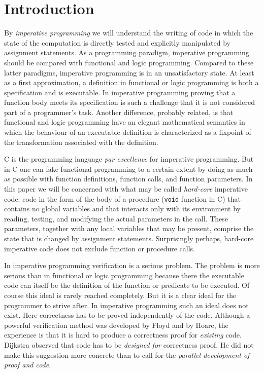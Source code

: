 \documentclass[preprint,11pt]{elsarticle}
\begin{document}
\section{Introduction}
By \emph{imperative programming} we will understand
the writing of code in which the state of the computation
is directly tested
and explicitly manipulated by assignment statements.
As a programming paradigm, imperative programming should be
compared with functional and logic programming.
Compared to these latter paradigms,
imperative programming is in an unsatisfactory state.
At least as a first approximation,
a definition in functional or logic programming
is both a specification and is executable.
In imperative programming proving that a function body
meets its specification is such a challenge
that it is not considered part of a programmer's task.
Another difference, probably related,
is that functional and logic programming
have an elegant mathematical semantics
in which the behaviour of an executable definition
is characterized as a fixpoint of the transformation
associated with the definition.

C is the programming language \emph{par excellence}
for imperative programming.
But in C one can fake functional programming to a certain extent
by doing as much as possible with function definitions,
function calls, and function parameters.
In this paper we will be concerned with what may be called
\emph{hard-core} imperative code:
code in the form of the body of a procedure
({\tt void} function in C) that contains no global variables
and that interacts only with its environment
by reading, testing, and modifying the actual parameters in the call.
These parameters,
together with any local variables that may be present,
comprise the state that is changed by assignment statements.
Surprisingly perhaps, hard-core imperative code does not
exclude function or procedure calls.

In imperative programming verification is a serious problem.
The problem is more serious than in functional or logic
programming because there the executable code can itself be 
the definition of the function or predicate to be executed.
Of course this ideal is rarely reached completely.
But it is a clear ideal for the programmer to strive after.
In imperative programming such an ideal does not exist.
Here correctness has to be proved independently of the code.
Although a powerful verification method was developed
by Floyd and by Hoare,
the experience is that it is hard to produce
a correctness proof for \emph{existing} code.
Dijkstra observed \cite{djk68a,djkInfotech71}
that code has to be \emph{designed
for} correctness proof.
He did not make this suggestion more concrete than
to call for the \emph{parallel development of proof and code}.
\end{document}
